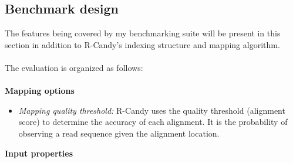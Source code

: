 \documentclass[11pt,a4paper]{report}
\begin{document}



\subsection{Benchmark design} \label{Benchmark design}

The features being covered by my benchmarking suite will be present in this section in addition to R-Candy's indexing structure and mapping algorithm.
\\\\
The evaluation is organized as follows: 
\\\\
\textbf{Mapping options}


\begin{itemize}

 \item \emph{Mapping quality threshold:} R-Candy uses the quality threshold (alignment score) to determine the accuracy of each alignment. 
 It is the probability of observing a read sequence given the alignment location. 

\end{itemize}
\textbf{Input properties}
\end{document}
